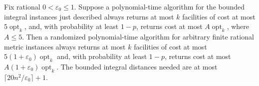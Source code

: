 \begin{lemma}\label{pre:rounding}
Fix rational $0<\varepsilon_0\le1$. Suppose a polynomial-time algorithm for the bounded
integral instances just described always returns at most $k$ facilities
of cost at most $5\operatorname{opt}_k$, and, with probability at least
$1-p$, returns cost at most $A\operatorname{opt}_k$, where $A\le5$.
Then a randomized polynomial-time algorithm for arbitrary finite
rational metric instances always returns at most $k$ facilities of
cost at most $5(1+\varepsilon_0)\operatorname{opt}_k$ and, with
probability at least $1-p$, returns cost at most
$A(1+\varepsilon_0)\operatorname{opt}_k$.
The bounded integral distances needed are at most
$\lceil20n^2/\varepsilon_0\rceil+1$.
\end{lemma}

